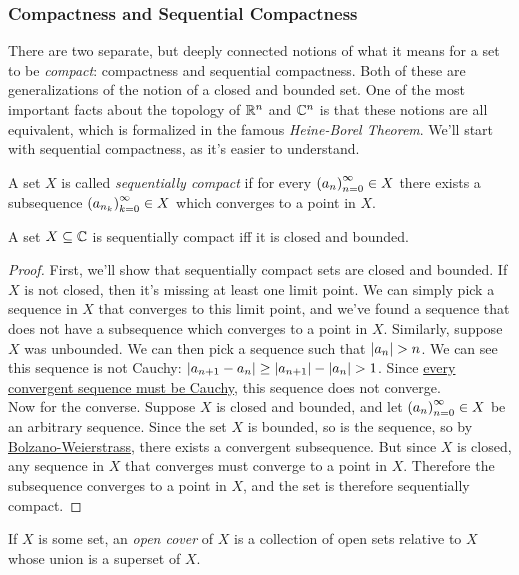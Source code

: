 \subsubsection{Compactness and Sequential Compactness}
There are two separate, but deeply connected notions of what it means for a set to be \emph{compact}: compactness and sequential compactness. Both of these are generalizations of the notion of a closed and bounded set. One of the most important facts about the topology of $\mathbb{R}^n$ and $\mathbb{C}^n$ is that these notions are all equivalent, which is formalized in the famous \emph{Heine-Borel Theorem}. We'll start with sequential compactness, as it's easier to understand.
\begin{definition}
A set $X$ is called \emph{sequentially compact} if for every $\seq{a} \in X$ there exists a subsequence $\seq{a}[n_k][k] \in X$ which converges to a point in $X$.
\end{definition}
\begin{theorem}
A set $X \subseteq \mathbb{C}$ is sequentially compact iff it is closed and bounded.
\end{theorem}
\begin{proof}
First, we'll show that sequentially compact sets are closed and bounded. If $X$ is not closed, then it's missing at least one limit point. We can simply pick a sequence in $X$ that converges to this limit point, and we've found a sequence that does not have a subsequence which converges to a point in $X$. Similarly, suppose $X$ was unbounded. We can then pick a sequence such that $\left\lvert a_n \right\rvert > n$. We can see this sequence is not Cauchy: $\left\lvert a_{n+1}-a_n \right\rvert \geq \left\lvert a_{n+1} \right\rvert-\left\lvert a_n \right\rvert > 1$. Since \hyperlink{Convergent Sequences are Cauchy}{every convergent sequence must be Cauchy}, this sequence does not converge.\\
Now for the converse. Suppose $X$ is closed and bounded, and let $\seq{a} \in X$ be an arbitrary sequence. Since the set $X$ is bounded, so is the sequence, so by \hyperlink{Bolzano-Weierstrass Theorem}{Bolzano-Weierstrass}, there exists a convergent subsequence. But since $X$ is closed, any sequence in $X$ that converges must converge to a point in $X$. Therefore the subsequence converges to a point in $X$, and the set is therefore sequentially compact.
\end{proof}
\begin{definition}
If $X$ is some set, an \emph{open cover} of $X$ is a collection of open sets relative to $X$ whose union is a superset of $X$.
\end{definition}
